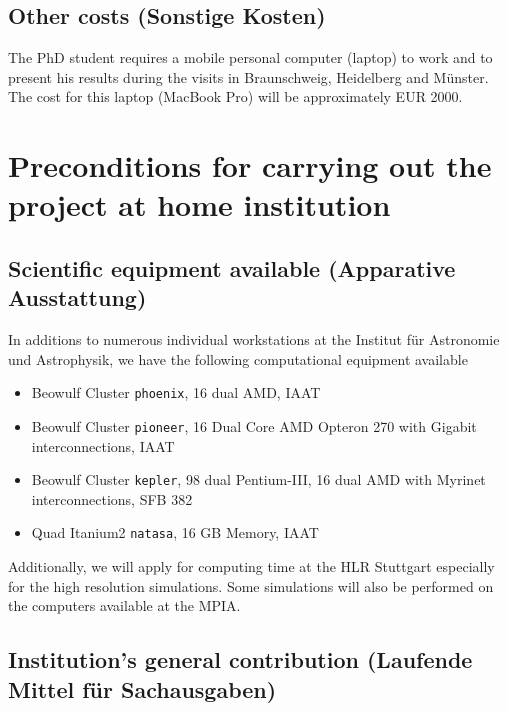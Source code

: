\subsection{Other costs (Sonstige Kosten)}
The PhD student requires a mobile personal computer (laptop) to work
and to present his results during the visits in Braunschweig,
Heidelberg and M\"unster. The cost for this laptop (MacBook Pro) will be
approximately EUR 2000.

\section{Preconditions for carrying out the project at home institution}
%
%
\subsection{Scientific equipment available (Apparative Ausstattung)}
%
%
In additions to numerous individual workstations at the Institut f\"ur
Astronomie und Astrophysik, we have the following computational
equipment available
\begin{itemize}
\item Beowulf Cluster {\tt phoenix}, 16 dual AMD, IAAT
\item Beowulf Cluster {\tt pioneer}, 16 Dual Core AMD Opteron 270
with Gigabit interconnections, IAAT
\item Beowulf Cluster {\tt kepler}, 98 dual Pentium-III, 16 dual AMD
with Myrinet interconnections, SFB 382
\item Quad Itanium2 {\tt natasa}, 16 GB Memory, IAAT
\end{itemize}

Additionally, we will apply for computing time at the HLR Stuttgart
especially for the high resolution simulations. Some simulations will
also be performed on the computers available at the MPIA.


\subsection{Institution's general contribution (Laufende Mittel f\"ur  
Sachausgaben)}
%
%

